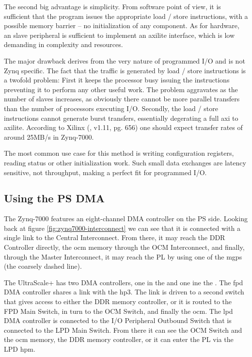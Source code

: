 The second big advantage is simplicity. From software point of view, 
it is sufficient that the program issues the appropriate load / store instructions,
with a possible memory barrier -- no initialization of any component.
As for hardware, an slave peripheral is sufficient to
implement an \gls{axilite} interface, which is low demanding in complexity and resources.

The major drawback derives from the very nature of programmed I/O and is not Zynq specific.
The fact that the traffic is generated by load / store instructions is a twofold problem:
First it keeps the processor busy issuing the instructions preventing it 
to perform any other useful work. The problem aggravates as the number of slaves increases,
as obviously there cannot be more parallel transfers than the number of processors executing I/O.
Secondly, the load / store instructions cannot generate \gls{burst} transfers,
essentially degerating a full \gls{axi} to \gls{axilite}. 
According to Xilinx (\cite{ug585}, v1.11, pg. 656) one should expect 
transfer rates of around 25MB/s in Zynq-7000.

The most common use case for this method is writing configuration registers,
reading status or other initialization work. 
Such small data exchanges are latency sensitive, not throughput,
making a perfect fit for programmed I/O.

\subsection{Using the PS DMA}

The Zynq-7000 features an eight-channel DMA controller on the PS side.
Looking back at figure \ref{fig:zynq7000-interconnect} we can see that it is connected
with a single link to the Central Interconnect. 
From there, it may reach the DDR Controller directly, the \gls{ocm} memory through the
OCM Interconnect, and finally, through the Master Interconnect, it may reach the PL by
using one of the \glspl{mgp} (the coarsely dashed line). 

The UltraScale+ has two DMA controllers, one in the  and one
ine the . 
The \gls{fpd} DMA controller shares a link with the \gls{hp}3. The link
is driven to a second switch that gives access to either the DDR memory controller,
or it is routed to the FPD Main Switch, in turn to the OCM Switch, and finally the \gls{ocm}.
The \gls{lpd} DMA controller is connected to the I/O Peripheral Outbound Switch that is
connected to the LPD Main Switch. From there it can see the OCM Switch and the \gls{ocm} memory,
the DDR memory controller, or it can enter the PL via the LPD \gls{hpm}.

